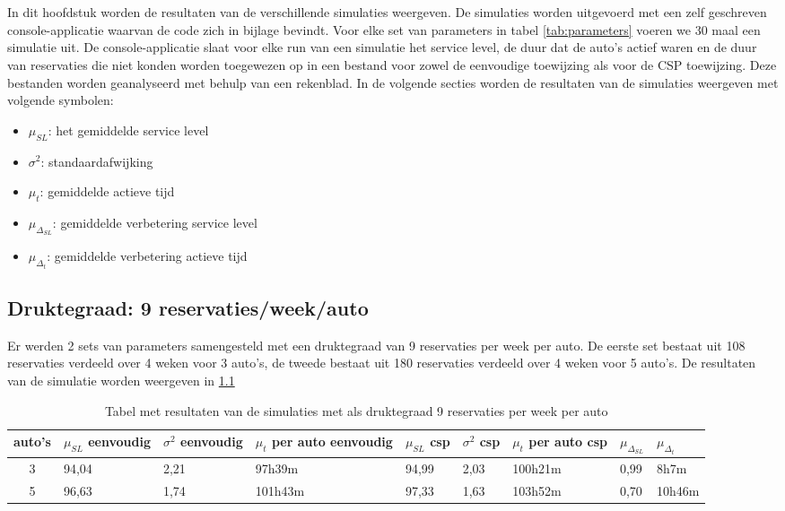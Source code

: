 \chapter{}
\label{ch:resultaten-simulaties}
In dit hoofdstuk worden de resultaten van de verschillende simulaties weergeven. De simulaties worden uitgevoerd met een zelf geschreven console-applicatie waarvan de code zich in bijlage bevindt. Voor elke set van parameters in tabel \ref{tab:parameters} voeren we 30 maal een simulatie uit. De console-applicatie slaat voor elke run van een simulatie het service level, de duur dat de auto's actief waren en de duur van reservaties die niet konden worden toegewezen op in een bestand voor zowel de eenvoudige toewijzing als voor de CSP toewijzing. Deze bestanden worden geanalyseerd met behulp van een rekenblad.
In de volgende secties worden de resultaten van de simulaties weergeven met volgende symbolen:
\begin{itemize}
	\item $\mu_{ SL}$: het gemiddelde service level
	\item $\sigma^2$: standaardafwijking
	\item $\mu_{ t}$: gemiddelde actieve tijd
	\item $\mu_{\Delta_{ SL}}$: gemiddelde verbetering service level
	\item $\mu_{\Delta_{ t}}$: gemiddelde verbetering actieve tijd
\end{itemize}

\section{Druktegraad: 9 reservaties/week/auto}
Er werden 2 sets van parameters samengesteld met een druktegraad van 9 reservaties per week per auto. 
De eerste set bestaat uit 108 reservaties verdeeld over 4 weken voor 3 auto's, de tweede bestaat uit 180 reservaties verdeeld over 4 weken voor 5 auto's. 
De resultaten van de simulatie worden weergeven in \ref{tab:resultaten9}
\begin{table}[h]
	\centering
	\begin{tabular}{ | c | p{1.5cm} | p{1.5cm} | p{1.5cm} | p{1.5cm} | p{1.5cm} | p{1.5cm} | p{1.5cm} | p{1.5cm} |}
		\hline
		auto's & $\mu_{ SL}$ eenvoudig & $\sigma^2$ eenvoudig & $\mu_{ t}$ per auto eenvoudig & $\mu_{ SL}$ csp & $\sigma^2$ csp & $\mu_{ t}$ per auto csp & $\mu_{\Delta_{ SL}}$ & $\mu_{\Delta_{ t}}$ \\ \hline
		3 & 94,04 & 2,21 & 97h39m & 94,99 & 2,03 & 100h21m & 0,99 & 8h7m  \\ \hline
		5 & 96,63 & 1,74 & 101h43m & 97,33 & 1,63 & 103h52m & 0,70 & 10h46m \\ \hline
	\end{tabular}
	\caption{Tabel met resultaten van de simulaties met als druktegraad 9 reservaties per week per auto}
	\label{tab:resultaten9}
\end{table}
